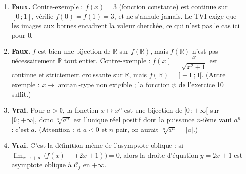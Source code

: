 \documentclass[11pt]{article}
\begin{document}
\begin{corrige}
\begin{enumerate}
\item \textbf{Faux.} Contre-exemple : $f(x)=3$ (fonction constante) est continue sur $[0\,;1]$, vérifie $f(0)=f(1)=3$, et ne s'annule jamais. Le TVI exige que les images aux bornes encadrent la valeur cherchée, ce qui n'est pas le cas ici pour $0$.

\item \textbf{Faux.} $f$ est bien une bijection de $\mathbb{R}$ sur $f(\mathbb{R})$, mais $f(\mathbb{R})$ n'est pas nécessairement $\mathbb{R}$ tout entier. Contre-exemple : $f(x)=\dfrac{x}{\sqrt{x^2+1}}$ est continue et strictement croissante sur $\mathbb{R}$, mais $f(\mathbb{R})=\,]-1\,;1[$. (Autre exemple : $x\mapsto \arctan$-type non exigible ; la fonction $\psi$ de l'exercice 10 suffit.)

\item \textbf{Vrai.} Pour $a>0$, la fonction $x\mapsto x^n$ est une bijection de $[0\,;+\infty[$ sur $[0\,;+\infty[$, donc $\sqrt[n]{a^n}$ est l'unique réel positif dont la puissance $n$-ième vaut $a^n$ : c'est $a$. (Attention : si $a<0$ et $n$ pair, on aurait $\sqrt[n]{a^n}=|a|$.)

\item \textbf{Vrai.} C'est la définition même de l'asymptote oblique : si $\lim_{x\to+\infty}\big(f(x)-(2x+1)\big)=0$, alors la droite d'équation $y=2x+1$ est asymptote oblique à $\mathcal{C}_f$ en $+\infty$.
\end{enumerate}
\end{corrige}
\end{document}
